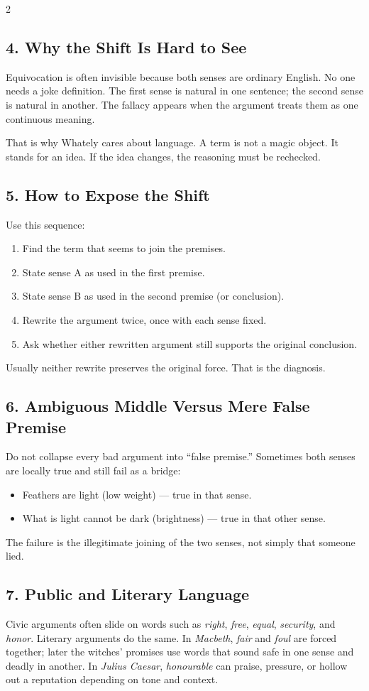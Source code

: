 \documentclass[12pt]{article}
\begin{document}
\begin{multicols}{2}
\subsection*{4. Why the Shift Is Hard to See}
Equivocation is often invisible because both senses are ordinary English. No one needs a joke definition. The first sense is natural in one sentence; the second sense is natural in another. The fallacy appears when the argument treats them as one continuous meaning.

That is why Whately cares about language. A term is not a magic object. It stands for an idea. If the idea changes, the reasoning must be rechecked.

\subsection*{5. How to Expose the Shift}
Use this sequence:
\begin{enumerate}[leftmargin=*,itemsep=0.12em]
\item Find the term that seems to join the premises.
\item State sense A as used in the first premise.
\item State sense B as used in the second premise (or conclusion).
\item Rewrite the argument twice, once with each sense fixed.
\item Ask whether either rewritten argument still supports the original conclusion.
\end{enumerate}
Usually neither rewrite preserves the original force. That is the diagnosis.

\subsection*{6. Ambiguous Middle Versus Mere False Premise}
Do not collapse every bad argument into ``false premise.'' Sometimes both senses are locally true and still fail as a bridge:
\begin{itemize}[leftmargin=*]
\item Feathers are light (low weight) --- true in that sense.
\item What is light cannot be dark (brightness) --- true in that other sense.
\end{itemize}
The failure is the illegitimate joining of the two senses, not simply that someone lied.

\subsection*{7. Public and Literary Language}
Civic arguments often slide on words such as \textit{right}, \textit{free}, \textit{equal}, \textit{security}, and \textit{honor}. Literary arguments do the same. In \textit{Macbeth}, \textit{fair} and \textit{foul} are forced together; later the witches' promises use words that sound safe in one sense and deadly in another. In \textit{Julius Caesar}, \textit{honourable} can praise, pressure, or hollow out a reputation depending on tone and context.


\end{multicols}
\end{document}
